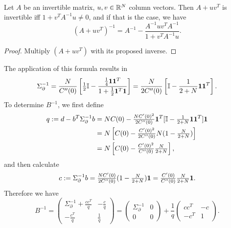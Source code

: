 \begin{lemma}
	Let \(A\) be an invertible matrix, \(u,v\in\mathbb{R}^N\) column vectors.
	Then \(A+ uv^T\) is invertible iff \(1+v^T A^{-1}u \neq 0\), and if that is
	the case, we have
	\[
		(A+uv^T)^{-1} = A^{-1} - \frac{A^{-1}u v^T A^{-1}}{1+v^T A^{-1}u}.
	\]
\end{lemma}
\begin{proof}
	Multiply \((A+uv^T)\) with its proposed inverse.
\end{proof}

The application of this formula results in
\begin{equation}\label{eq: sigma_partial inverse}
	\Sigma_\partial^{-1}
	= \frac{N}{C''(0)}\left[
		\tfrac12\mathbb{I} - \frac{\tfrac14\mathbf{1}\mathbf{1}^T}{1+\tfrac12\mathbf{1}^T\mathbf{1}}
	\right]
	= \frac{N}{2C''(0)}\left[
		\mathbb{I} - \frac{1}{2+N}\mathbf{1}\mathbf{1}^T
	\right].
\end{equation}
To determine \(B^{-1}\), we first define
\begin{align*}
	q := d - b^T \Sigma_\partial^{-1}b
	&= NC(0) - \tfrac{NC'(0)^2}{2C''(0)}\mathbf{1}^T
	[\mathbb{I}-\tfrac1{2+N}\mathbf{1}\mathbf{1}^T]\mathbf{1}\\
	&= N\left[
		C(0) - \tfrac{C'(0)^2}{2C''(0)}
		N( 1-\tfrac{N}{2+N} )
	\right]\\
	&= N\left[
		C(0) - \tfrac{C'(0)^2}{C''(0)}
		\tfrac{N}{2+N}
	\right],
\end{align*}
and then calculate
\begin{equation}\label{eq: definition of c=sigma_partial^{-1} b}
	c:=\Sigma_\partial^{-1}b
	= \tfrac{\dimension\sqC'(0)}{2\sqC''(0)}( 1 - \tfrac{\dimension}{2+\dimension} )\ones
	= \tfrac{\sqC'(0)}{\sqC''(0)}\tfrac{\dimension}{2+\dimension}\ones.
\end{equation}
Therefore we have
\begin{equation}\label{eq: inv B split}
	B^{-1} = \begin{pmatrix}
		\Sigma_\partial^{-1}	+ \frac{cc^T}{q} & - \frac{c}{q}\\
		-\frac{c^T}{q} & \frac1q
	\end{pmatrix}
	= \begin{pmatrix}
		\Sigma_\partial^{-1} & 0 \\
		0 & 0
	\end{pmatrix}
	+ \frac1q \begin{pmatrix}
		cc^T & -c\\
		-c^T & 1
	\end{pmatrix}.
\end{equation}

